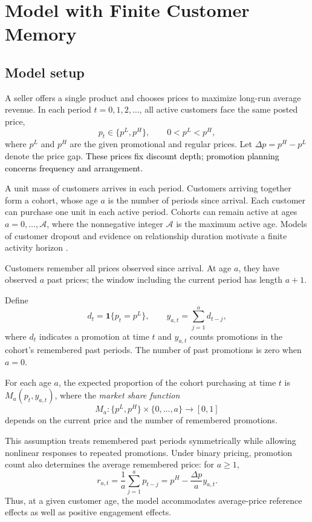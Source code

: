 \section{Model with Finite Customer Memory}
\label{sec:model}

\subsection{Model setup}
A seller offers a single product and chooses prices to maximize long-run average revenue. In each period \(t=0,1,2,\ldots\), all active customers face the same posted price,
\[
    p_t\in\{p^L,p^H\},
    \qquad 0<p^L<p^H,
\]
where \(p^L\) and \(p^H\) are the given promotional and regular prices. Let \(\Delta p=p^H-p^L\) denote the price gap.
\textcolor{black}{These prices fix discount depth; promotion planning concerns frequency and arrangement.}

A unit mass of customers arrives in each period. Customers arriving together form a cohort, whose age \(a\) is the number of periods since arrival. Each customer can purchase one unit in each active period. Cohorts can remain active at ages \(a=0,\ldots,\mathcal A\), where the nonnegative integer \(\mathcal A\) is the maximum active age. Models of customer dropout and evidence on relationship duration motivate a finite activity horizon \citep{schmittlein1987customers,fader2005customers,reinartz2000lifetime}.

Customers remember all prices observed since arrival. At age \(a\), they have observed \(a\) past prices; the window including the current period has length \(a+1\).

Define
\[
    d_t=\mathbf 1\{p_t=p^L\},
    \qquad
    y_{a,t}=\sum_{j=1}^{a}d_{t-j},
\]
where \(d_t\) indicates a promotion at time \(t\) and \(y_{a,t}\) counts promotions in the cohort's remembered past periods. The number of past promotions is zero when \(a=0\).

\begin{assumption}\label{ass:count-based}
For each age \(a\), the expected proportion of the cohort purchasing at time \(t\) is \(M_a(p_t,y_{a,t})\), where the \textit{market share function}
\[
    M_a:\{p^L,p^H\}\times\{0,\ldots,a\}\longrightarrow[0,1]
\]
depends on the current price and the number of remembered promotions.
\end{assumption}

This assumption treats remembered past periods symmetrically while allowing nonlinear responses to repeated promotions. Under binary pricing, promotion count also determines the average remembered price: for \(a\ge1\),
\[
    r_{a,t}
    =\frac{1}{a}\sum_{j=1}^{a}p_{t-j}
    =p^H-\frac{\Delta p}{a}y_{a,t}.
\]
Thus, at a given customer age, the model accommodates average-price reference effects as well as positive engagement effects.

